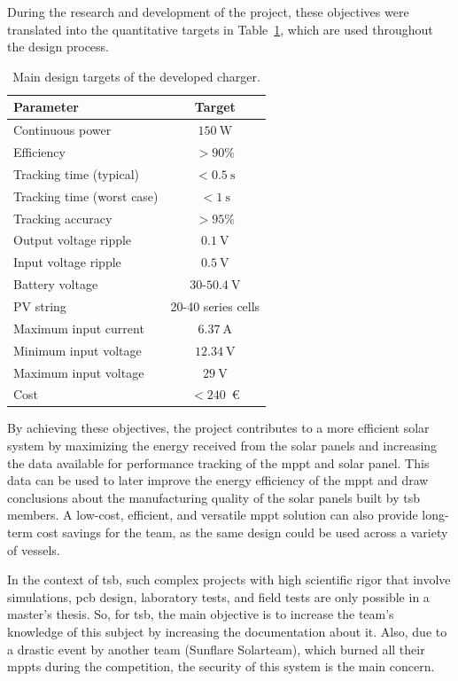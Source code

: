 During the research and development of the project, these objectives were translated into the quantitative targets in Table~\ref{tab:design-targets}, which are used throughout the design process.

\begin{table}[!ht]
    \centering
    \caption{Main design targets of the developed charger.}
    \label{tab:design-targets}
    \begin{tabular}{lc}
        \toprule
        Parameter & Target \\
        \midrule
        Continuous power & \(150~\mathrm{W}\) \\
        Efficiency & \(> 90\%\) \\
        Tracking time (typical) & \(< 0.5~\mathrm{s}\) \\
        Tracking time (worst case) & \(< 1~\mathrm{s}\) \\
        Tracking accuracy & \(> 95\%\) \\
        Output voltage ripple & \(0.1~\mathrm{V}\) \\
        Input voltage ripple & \(0.5~\mathrm{V}\) \\
        Battery voltage & \(30\)-\(50.4~\mathrm{V}\) \\
        PV string & 20-40 series cells \\
        Maximum input current & \(6.37~\mathrm{A}\) \\
        Minimum input voltage & \(12.34~\mathrm{V}\) \\
        Maximum input voltage & \(29~\mathrm{V}\) \\
        Cost & \(< 240\)~€ \\
        \bottomrule
    \end{tabular}
\end{table}

By achieving these objectives, the project contributes to a more efficient solar system by maximizing the energy received from the solar panels and increasing the data available for performance tracking of the \ac{mppt} and solar panel. This data can be used to later improve the energy efficiency of the \ac{mppt} and draw conclusions about the manufacturing quality of the solar panels built by \ac{tsb} members. A low-cost, efficient, and versatile \ac{mppt} solution can also provide long-term cost savings for the team, as the same design could be used across a variety of vessels.

In the context of \ac{tsb}, such complex projects with high scientific rigor that involve simulations, \ac{pcb} design, laboratory tests, and field tests are only possible in a master's thesis. So, for \ac{tsb}, the main objective is to increase the team's knowledge of this subject by increasing the documentation about it. Also, due to a drastic event by another team (Sunflare Solarteam), which burned all their \acp{mppt} during the competition, the security of this system is the main concern.



